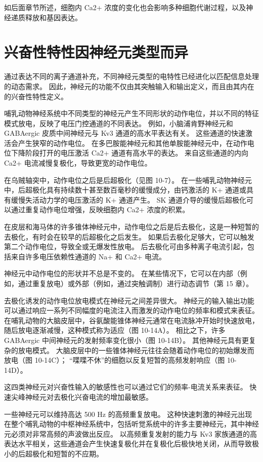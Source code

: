 如后面章节所述，细胞内 Ca2+ 浓度的变化也会影响多种细胞代谢过程，以及神经递质释放和基因表达。

\section{兴奋性特性因神经元类型而异}

通过表达不同的离子通道补充，不同神经元类型的电特性已经进化以匹配信息处理的动态需求。 因此，神经元的功能不仅由其突触输入和输出定义，而且由其内在的兴奋性特性定义。

哺乳动物神经系统中不同类型的神经元产生不同形状的动作电位，并以不同的特征模式放电，反映了电压门控通道的不同表达。 例如，小脑浦肯野神经元和 GABAergic 皮质中间神经元与 Kv3 通道的高水平表达有关。 这些通道的快速激活会产生狭窄的动作电位。 在多巴胺能神经元和其他单胺能神经元中，在动作电位下降阶段打开的电压激活 Ca2+ 通道有高水平的表达。 来自这些通道的内向 Ca2+ 电流减慢复极化，导致更宽的动作电位。

在乌贼轴突中，动作电位之后是后超极化（见图 10-7）。 在一些哺乳动物神经元中，后超极化具有持续数十甚至数百毫秒的缓慢成分，由钙激活的 K+ 通道或具有缓慢失活动力学的电压激活的 K+ 通道产生。 SK 通道介导的缓慢后超极化可以通过重复动作电位增强，反映细胞内 Ca2+ 浓度的积累。

在皮层和海马体的许多锥体神经元中，动作电位之后是后去极化，这是一种短暂的去极化，有时会在较早的后超极化之后发生。 如果后去极化足够大，它可以触发第二个动作电位，导致全或无爆发性放电。 后去极化可由多种离子电流引起，包括来自许多电压依赖性通道的 Na+ 和 Ca2+ 电流。

神经元中动作电位的形状并不总是不变的。 在某些情况下，它可以在内部（例如，通过重复放电）或外部（例如，通过突触调制）进行动态调节（第 15 章）。

去极化诱发的动作电位放电模式在神经元之间差异很大。 神经元的输入输出功能可以通过响应一系列不同幅度的电流注入而激发的动作电位的频率和模式来表征。 在哺乳动物的大脑皮层中，谷氨酸能锥体神经元通常在电流脉冲开始时快速放电，随后放电逐渐减慢，这种模式称为适应（图 10-14A）。 相比之下，许多 GABAergic 中间神经元的发射频率变化很小（图 10-14B）。 其他神经元具有更复杂的放电模式。 大脑皮层中的一些锥体神经元往往会随着动作电位的初始爆发而放电（图 10-14C）； “喋喋不休”的细胞以反复短暂的高频发射响应（图 10-14D）。

这四类神经元对兴奋性输入的敏感性也可以通过它们的频率-电流关系来表征。 快速尖峰神经元对去极化兴奋电流的增加最敏感。

一些神经元可以维持高达 500 Hz 的高频重复放电。 这种快速刺激的神经元出现在整个哺乳动物的中枢神经系统中，包括听觉系统中的许多主要神经元，其中神经元必须对非常高频的声波做出反应。 以高频重复发射的能力与 Kv3 家族通道的高表达水平相关，这些通道会产生快速复极化并在复极化后极快地关闭，从而导致极小的后超极化和短暂的不应期。

